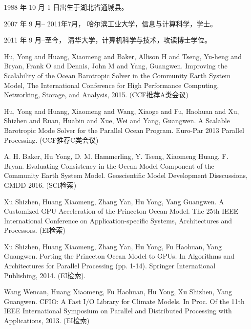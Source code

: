 \begin{resume}


  1988 年 10 月 1 日出生于湖北省通城县。

  2007 年 9 月-- 2011年7月， 哈尔滨工业大学，信息与计算科学，学士。

  2011 年 9 月--至今， 清华大学，计算机科学与技术，攻读博士学位。


  \begin{publications}
    \item Hu, Yong and Huang, Xiaomeng and Baker, Allison H and Tseng, Yu-heng and Bryan, Frank O and Dennis, John M and Yang, Guangwen. Improving the Scalability of the Ocean Barotropic Solver in the Community Earth System Model, The International Conference for High Performance Computing, Networking, Storage, and Analysis, 2015.  (CCF推荐A类会议)
    \item  Hu, Yong and Huang, Xiaomeng and Wang, Xiaoge and Fu, Haohuan and Xu, Shizhen and Ruan, Huabin and Xue, Wei and Yang, Guangwen. A Scalable Barotropic Mode Solver for the Parallel Ocean Program. Euro-Par 2013 Parallel Processing. (CCF推荐C类会议) 
  \end{publications}

  \begin{publications}[before=\publicationskip,after=\publicationskip]
    \item A. H. Baker, Hu Yong, D. M. Hammerling, Y. Tseng, Xiaomeng Huang, F. Bryan. Evaluating Consistency in the Ocean Model Component of the Community Earth System Model. Geoscientific Model Development Disscussions, GMDD 2016. (SCI检索)
  \end{publications}

  \begin{publications}
    \item Xu Shizhen, Huang Xiaomeng, Zhang Yan, Hu Yong, Yang Guangwen. A Customized GPU Acceleration of the Princeton Ocean Model. The 25th IEEE International Conference on Application-specific Systems, Architectures and Processors. (EI检索)
     \item  Xu Shizhen, Huang Xiaomeng, Zhang Yan, Hu Yong, Fu Haohuan,  Yang Guangwen. Porting the Princeton Ocean Model to GPUs. In Algorithms and Architectures for Parallel Processing (pp. 1-14). Springer International Publishing, 2014. (EI检索).
    \item Wang Wencan, Huang Xiaomeng, Fu Haohuan, Hu Yong, Xu Shizhen, Yang Guangwen. CFIO: A Fast I/O Library for Climate Models. In Proc. Of the 11th IEEE International Symposium on Parallel and Distributed Processing with Applications, 2013. (EI检索)
    

\end{publications}
\end{resume}
